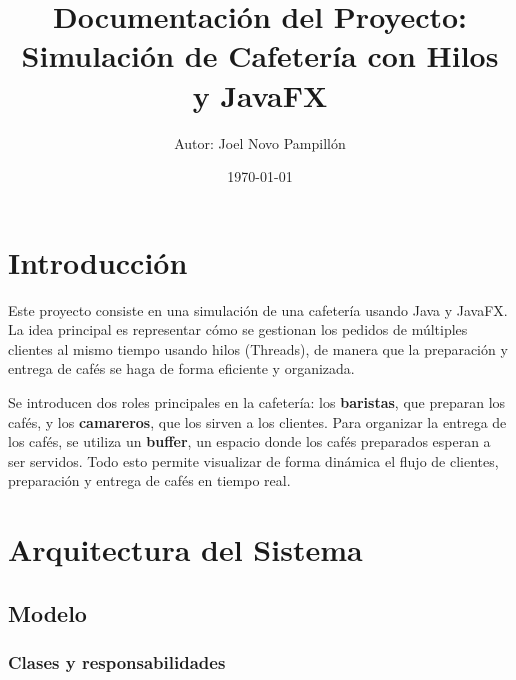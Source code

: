 \documentclass[12pt,a4paper]{article}
\title{Documentación del Proyecto: Simulación de Cafetería con Hilos y JavaFX}
\author{Autor: Joel Novo Pampillón}
\date{\today}
\begin{document}
\maketitle

\section*{Introducción}

Este proyecto consiste en una simulación de una cafetería usando Java y JavaFX. La idea principal es representar cómo se gestionan los pedidos de múltiples clientes al mismo tiempo usando hilos (Threads), de manera que la preparación y entrega de cafés se haga de forma eficiente y organizada.

Se introducen dos roles principales en la cafetería: los \textbf{baristas}, que preparan los cafés, y los \textbf{camareros}, que los sirven a los clientes. Para organizar la entrega de los cafés, se utiliza un \textbf{buffer}, un espacio donde los cafés preparados esperan a ser servidos. Todo esto permite visualizar de forma dinámica el flujo de clientes, preparación y entrega de cafés en tiempo real.


\section{Arquitectura del Sistema}

\subsection{Modelo}

\subsubsection*{Clases y responsabilidades}
\end{document}
